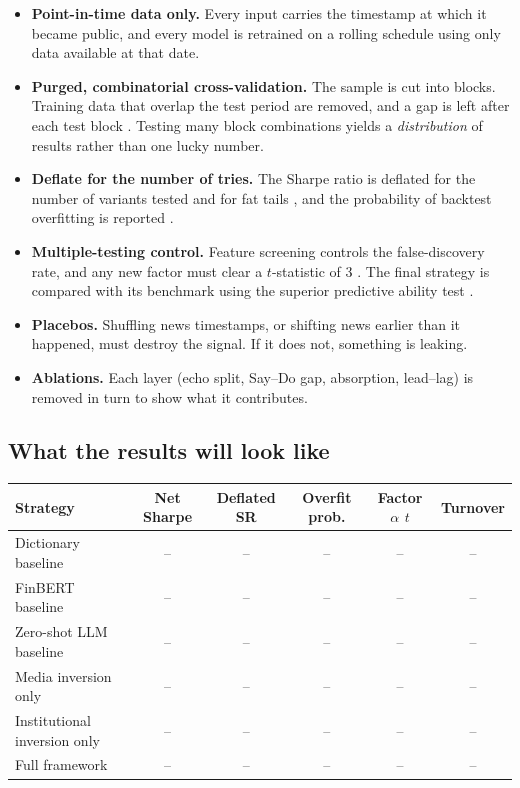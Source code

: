 \documentclass[11pt,a4paper]{article}
\theoremstyle{plain}
\theoremstyle{definition}
\begin{document}
\begin{itemize}
  \item \textbf{Point-in-time data only.} Every input carries the timestamp at which it became public, and every model is retrained on a rolling schedule using only data available at that date.
  \item \textbf{Purged, combinatorial cross-validation.} The sample is cut into blocks. Training data that overlap the test period are removed, and a gap is left after each test block \citep{lopezdeprado2018}. Testing many block combinations yields a \emph{distribution} of results rather than one lucky number.
  \item \textbf{Deflate for the number of tries.} The Sharpe ratio is deflated for the number of variants tested and for fat tails \citep{bailey2014dsr}, and the probability of backtest overfitting is reported \citep{bailey2017pbo}.
  \item \textbf{Multiple-testing control.} Feature screening controls the false-discovery rate, and any new factor must clear a $t$-statistic of 3 \citep{harvey2016}. The final strategy is compared with its benchmark using the superior predictive ability test \citep{hansen2005}.
  \item \textbf{Placebos.} Shuffling news timestamps, or shifting news earlier than it happened, must destroy the signal. If it does not, something is leaking.
  \item \textbf{Ablations.} Each layer (echo split, Say--Do gap, absorption, lead--lag) is removed in turn to show what it contributes.
\end{itemize}

\subsection{What the results will look like}

\begin{center}
\small
\begin{tabular}{@{}lccccc@{}}
\toprule
Strategy & Net Sharpe & Deflated SR & Overfit prob. & Factor $\alpha$ $t$ & Turnover \\
\midrule
Dictionary baseline & -- & -- & -- & -- & -- \\
FinBERT baseline & -- & -- & -- & -- & -- \\
Zero-shot LLM baseline & -- & -- & -- & -- & -- \\
Media inversion only & -- & -- & -- & -- & -- \\
Institutional inversion only & -- & -- & -- & -- & -- \\
Full framework & -- & -- & -- & -- & -- \\
\bottomrule
\end{tabular}
\end{center}
\end{document}
